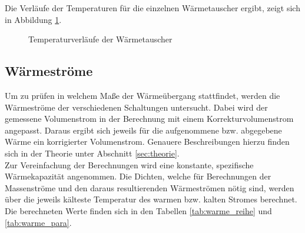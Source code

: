 Die Verläufe der Temperaturen für die einzelnen Wärmetauscher ergibt, zeigt sich in Abbildung \ref{dia:temp_profil}.

\vspace*{-7mm}

\begin{figure}[h!]
	\begin{center}
		\caption{Temperaturverläufe der Wärmetauscher}
		\label{dia:temp_profil}
	\end{center}
\end{figure}
\FloatBarrier

\subsection{Wärmeströme}
Um zu prüfen in welchem Maße der Wärmeübergang stattfindet, werden die Wärmeströme der verschiedenen Schaltungen untersucht. Dabei wird der gemessene Volumenstrom in der Berechnung mit einem Korrekturvolumenstrom angepasst. Daraus ergibt sich jeweils für die aufgenommene bzw. abgegebene Wärme ein korrigierter Volumenstrom. Genauere Beschreibungen hierzu finden sich in der Theorie unter Abschnitt \ref{sec:theorie}.\\
Zur Vereinfachung der Berechnungen wird eine konstante, spezifische Wärmekapazität angenommen. Die Dichten, welche für Berechnungen der Massenströme und den daraus resultierenden Wärmeströmen nötig sind, werden über die jeweils kälteste Temperatur des warmen bzw. kalten Stromes berechnet.\\
Die berechneten Werte finden sich in den Tabellen \ref{tab:warme_reihe} und \ref{tab:warme_para}.

